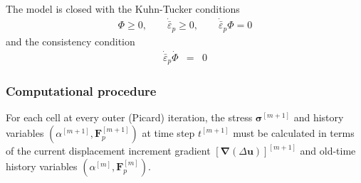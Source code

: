 \documentclass[sn-mathphys,Numbered]{sn-jnl}%
\newcommand{\bb}{\boldsymbol}
\begin{document}
The model is closed with the Kuhn-Tucker conditions
\begin{eqnarray}
	\Phi \geq 0, \quad\quad
	\dot{\bar{\varepsilon}}_p \geq 0, \quad\quad
	\dot{\bar{\varepsilon}}_p \Phi = 0
\end{eqnarray}
and the consistency condition
\begin{eqnarray}
	\dot{\bar{\varepsilon}}_p \dot{\Phi} &=& 0
\end{eqnarray}


\subsubsection{Computational procedure}

For each cell at every outer (Picard) iteration, the stress $\bb{\sigma}^{[m+1]}$ and history variables $\left(\alpha^{[m+1]}, \bb{F}_p^{[m+1]}\right)$ at time step $t^{[m+1]}$ must be calculated in terms of the current displacement increment gradient $[\bb{\nabla} (\Delta \bb{u})]^{[m+1]}$ and old-time history variables $\left(\alpha^{[m]}, \bb{F}_p^{[m]}\right)$.

\end{document}
